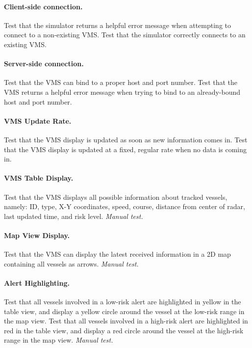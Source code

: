 \documentclass{article}
\begin{document}
\paragraph{Client-side connection.} Test that the simulator returns a helpful error message when attempting to connect to a non-existing VMS. Test that the simulator correctly connects to an existing VMS.

\paragraph{Server-side connection.} Test that the VMS can bind to a proper host and port number. Test that the VMS returns a helpful error message when trying to bind to an already-bound host and port number.

\paragraph{VMS Update Rate.} Test that the VMS display is updated as soon as new information comes in. Test that the VMS display is updated at a fixed, regular rate when no data is coming in.

\paragraph{VMS Table Display.} Test that the VMS displays all possible information about tracked vessels, namely: ID, type, X-Y coordinates, speed, course, distance from center of radar, last updated time, and risk level. \emph{Manual test.}

\paragraph{Map View Display.} Test that the VMS can display the latest received information in a 2D map containing all vessels as arrows. \emph{Manual test.}

\paragraph{Alert Highlighting.} Test that all vessels involved in a low-risk alert are highlighted in yellow in the table view, and display a yellow circle around the vessel at the low-risk range in the map view. Test that all vessels involved in a high-risk alert are highlighted in red in the table view, and display a red circle around the vessel at the high-risk range in the map view. \emph{Manual test.}
\end{document}
